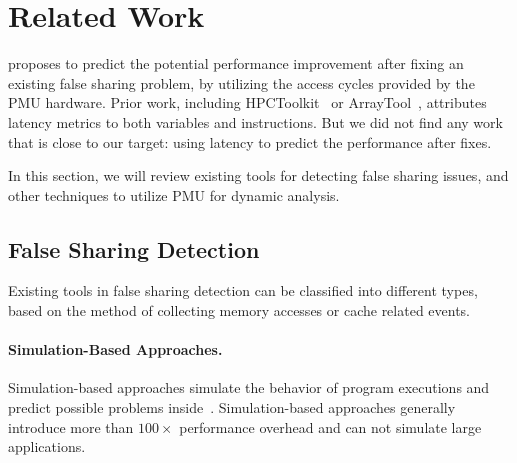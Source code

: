 \section{Related Work}

\label{sec:relatedwork}
\cheetah{} proposes to predict the potential performance improvement after fixing an existing false sharing problem, by utilizing the access cycles provided by the PMU hardware. Prior work, including HPCToolkit~\cite{ibs-sc} or ArrayTool~\cite{ibs-pact}, attributes latency metrics to both variables and instructions. But we did not find any work that is close to our target: using latency to predict the performance after fixes.
 

In this section, we will review existing tools for detecting false sharing issues, and other techniques to utilize PMU for dynamic analysis.

\subsection{False Sharing Detection}

Existing tools in false sharing detection can be classified into different types, based on the method of collecting memory accesses or cache related events. 

\paragraph{Simulation-Based Approaches.} Simulation-based approaches simulate the behavior of program executions and predict possible problems inside~\cite{falseshare:simulator}. Simulation-based approaches generally introduce more than $100\times$ performance overhead and can not simulate large applications. 


